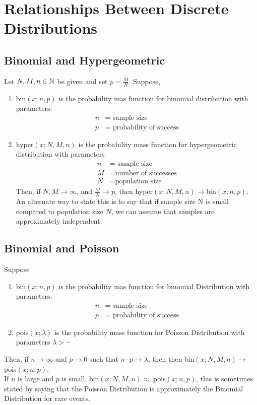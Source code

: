 \section[Relationships Between Discrete Distributions]{Relationships Between Discrete Distributions}
\subsection[Binomial and Hypergeometric]{Binomial and Hypergeometric}
Let $N,M,n\in \mathbb{N}$ be given and set $p=\frac{M}{N}$. Suppose,
\begin{enumerate}[itemsep=0pt, topsep=1pt, partopsep=0pt,label=(\alph*)]
\item bin$(x;n,p)$ is the probability mas function for binomial distribution with parameters: \begin{align*}
n&=\text{ sample size}\\
p&=\text{ probability of success}
\end{align*}
\item hyper$(x;N,M,n)$ is the probability mass function for hypergeometric distribution with parameters\begin{align*}
n&=\text{ sample size}\\
M&=\text{number of successes}\\
N&=\text{population size}
\end{align*}
Then, if $N,M\to \infty$, and $\frac{M}{N}\to p$, then hyper$(x;N,M,n)\to$bin$(x;n,p)$. 
\\

An alternate way to state this is to say that if sample size N is small compared to population size $N$, we can assume that samples are approximately independent.
\end{enumerate}
\subsection[Binomial and Poisson]{Binomial and Poisson}
Suppose \begin{enumerate}[itemsep=0pt, topsep=1pt, partopsep=0pt,label=(\alph*)]
\item bin$(x;n,p)$ is the probability mas function for binomial Distribution with parameters: \begin{align*}
n&=\text{ sample size}\\
p&=\text{ probability of success}
\end{align*}
\item pois$(x;\lambda)$ is the probability mass function for Poisson Distribution with parameters $\lambda>-$
\end{enumerate}
Then, if $n\to \infty$ and $p\to 0$ such that $n\cdot p\to \lambda$, then then bin$(x;N,M,n)\to$ pois$(x;n,p)$. 
\\

If $n$ is large and $p$ is small, bin$(x;N,M,n)\approx$ pois$(x;n,p)$, this is sometimes stated by saying that the Poisson Distribution is approximately the Binomial Distribution for rare events.